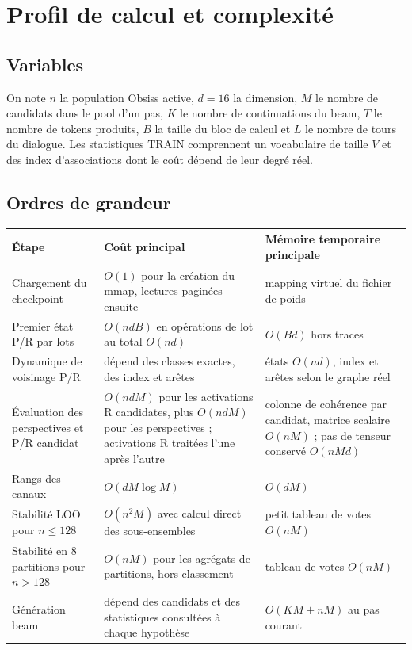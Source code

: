 \documentclass[11pt,a4paper]{report}
\begin{document}
\chapter{Profil de calcul et complexité}
\section{Variables}
On note $n$ la population Obsiss active, $d=16$ la dimension, $M$ le nombre de candidats dans le pool d'un pas, $K$ le nombre de continuations du beam, $T$ le nombre de tokens produits, $B$ la taille du bloc de calcul et $L$ le nombre de tours du dialogue. Les statistiques TRAIN comprennent un vocabulaire de taille $V$ et des index d'associations dont le coût dépend de leur degré réel.

\section{Ordres de grandeur}
\begin{longtable}{p{}p{}p{}}
\toprule
Étape & Coût principal & Mémoire temporaire principale \\
\midrule
Chargement du checkpoint & $O(1)$ pour la création du mmap, lectures paginées ensuite & mapping virtuel du fichier de poids \\
Premier état P/R par lots & $O(ndB)$ en opérations de lot au total $O(nd)$ & $O(Bd)$ hors traces \\
Dynamique de voisinage P/R & dépend des classes exactes, des index et arêtes & états $O(nd)$, index et arêtes selon le graphe réel \\
Évaluation des perspectives et P/R candidat & $O(ndM)$ pour les activations R candidates, plus $O(ndM)$ pour les perspectives ; activations R traitées l'une après l'autre & colonne de cohérence par candidat, matrice scalaire $O(nM)$ ; pas de tenseur conservé $O(nMd) $ \\
Rangs des canaux & $O(dM\log M)$ & $O(dM)$ \\
Stabilité LOO pour $n\leq128$ & $O(n^2M)$ avec calcul direct des sous-ensembles & petit tableau de votes $O(nM)$ \\
Stabilité en 8 partitions pour $n>128$ & $O(nM)$ pour les agrégats de partitions, hors classement & tableau de votes $O(nM)$ \\
Génération beam & dépend des candidats et des statistiques consultées à chaque hypothèse & $O(KM+nM)$ au pas courant \\
\bottomrule
\end{longtable}
\end{document}
